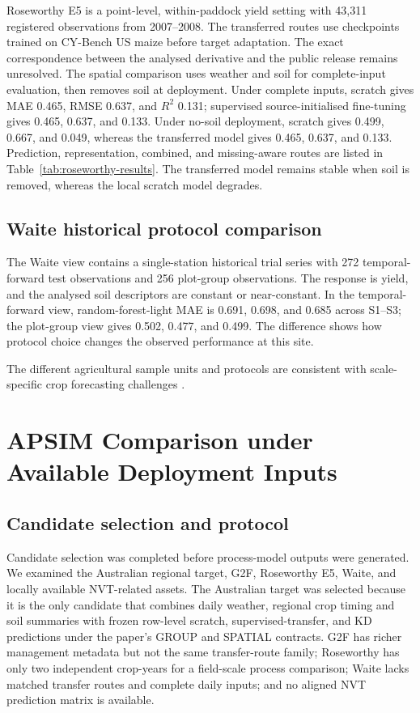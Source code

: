 \documentclass[runningheads]{venue/lncs/llncs}
\begin{document}
Roseworthy E5 is a point-level, within-paddock yield setting with 43,311 registered observations from 2007--2008. The transferred routes use checkpoints trained on CY-Bench US maize before target adaptation. The exact correspondence between the analysed derivative and the public release remains unresolved. The spatial comparison uses weather and soil for complete-input evaluation, then removes soil at deployment. Under complete inputs, scratch gives MAE 0.465, RMSE 0.637, and $R^2$ 0.131; supervised source-initialised fine-tuning gives 0.465, 0.637, and 0.133. Under no-soil deployment, scratch gives 0.499, 0.667, and 0.049, whereas the transferred model gives 0.465, 0.637, and 0.133. Prediction, representation, combined, and missing-aware routes are listed in Table~\ref{tab:roseworthy-results}. The transferred model remains stable when soil is removed, whereas the local scratch model degrades.


\subsection{Waite historical protocol comparison}

The Waite view contains a single-station historical trial series with 272 temporal-forward test observations and 256 plot-group observations. The response is yield, and the analysed soil descriptors are constant or near-constant. In the temporal-forward view, random-forest-light MAE is 0.691, 0.698, and 0.685 across S1--S3; the plot-group view gives 0.502, 0.477, and 0.499. The difference shows how protocol choice changes the observed performance at this site.

The different agricultural sample units and protocols are consistent with scale-specific crop forecasting challenges \cite{Brown2020AustralianWheat,Potgieter2002AustralianWheat,Richetti2024APSIMNVT}.

\section{APSIM Comparison under Available Deployment Inputs}\label{sec:apsim-comparison}

\subsection{Candidate selection and protocol}

Candidate selection was completed before process-model outputs were generated. We examined the Australian regional target, G2F, Roseworthy E5, Waite, and locally available NVT-related assets. The Australian target was selected because it is the only candidate that combines daily weather, regional crop timing and soil summaries with frozen row-level scratch, supervised-transfer, and KD predictions under the paper's GROUP and SPATIAL contracts. G2F has richer management metadata but not the same transfer-route family; Roseworthy has only two independent crop-years for a field-scale process comparison; Waite lacks matched transfer routes and complete daily inputs; and no aligned NVT prediction matrix is available.
\end{document}
